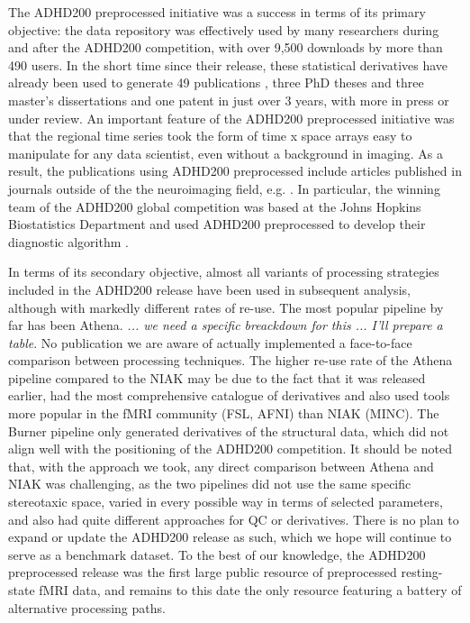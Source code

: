 \documentclass[preprint,12pt,1p]{elsarticle}
\begin{document}
The ADHD200 preprocessed initiative was a success in terms of its primary objective: the data repository was effectively used by many researchers during and after the ADHD200 competition, with over 9,500 downloads by more than 490 users.  In the short time since their release, these statistical derivatives have already been used to generate 49 publications \cite{Rangarajan2014, Liang2012, Tabas2014, Rangarajan2015, Mahanand2013, Lifshitz2012, Fujita2013, Ji2011, Li2015, Li2013, Liu2012,     DosSantosSiqueira2014, Olivetti2014, Han2015, Wang2013a, Subramanian2013, Dey2014, Bellec2012, Bohland2012, Chang2012, Cheng2012, Colby2012, Dai2012, Dey2012, Eloyan2012, Olivetti2012, Sato2012a, Carmona2015, Carmona2015a, Hou2015, Deshpande2015, She2014, Lavoie-Courchesne2012b, Chen2015, Nunez-Garcia2015, Solmaz2012, Anderson2014, KadkhodaeianBakhtiari2012, Sato2013, Kyeong2015, Sato2012, Takahashi2012, He2013, Kong2013, Yao2013, Yang2015, Ahn2015, Fujita2014, Reiss2014}, three PhD theses \cite{Colby2012a, Dey2013, Zhang2012} and three master's dissertations \cite{VanGalenLast2011, Vidal2014, Wang2013} and one patent \cite{Dey2013} in just over 3 years, with more in press or under review. An important feature of the ADHD200 preprocessed initiative was that the regional time series took the form of time x space arrays easy to manipulate for any data scientist, even without a background in imaging. As a result, the publications using ADHD200 preprocessed include articles published in journals outside of the the neuroimaging field, e.g. \citep{}. In particular, the winning team of the ADHD200 global competition was based at the Johns Hopkins Biostatistics Department and used ADHD200 preprocessed to develop their diagnostic algorithm \cite{Eloyan2012}.
\par 
In terms of its secondary objective, almost all variants of processing strategies included in the ADHD200 release have been used in subsequent analysis, although with markedly different rates of re-use. The most popular pipeline by far has been Athena. \emph{... we need a specific breackdown for this ... I'll prepare a table}. No publication we are aware of actually implemented a face-to-face comparison between processing techniques. The higher re-use rate of the Athena pipeline compared to the NIAK may be due to the fact that it was released earlier, had the most comprehensive catalogue of derivatives and also used tools more popular in the fMRI community (FSL, AFNI) than NIAK (MINC). The Burner pipeline only generated derivatives of the structural data, which did not align well with the positioning of the ADHD200 competition. It should be noted that, with the approach we took, any direct comparison between Athena and NIAK was challenging, as the two pipelines did not use the same specific stereotaxic space, varied in every possible way in terms of selected parameters, and also had quite different approaches for QC or derivatives. There is no plan to expand or update the ADHD200 release as such, which we hope will continue to serve as a benchmark dataset. To the best of our knowledge, the ADHD200 preprocessed release was the first large public resource of preprocessed resting-state fMRI data, and remains to this date the only resource featuring a battery of alternative processing paths. 
\end{document}
